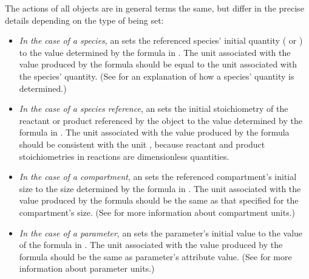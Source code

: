 The actions of all \InitialAssignment objects are in general terms
the same, but differ in the precise details depending on the type
of  being set:
\begin{itemize}

\item \emph{In the case of a species}, an \InitialAssignment sets
  the referenced species' initial quantity
  ( or ) to the value
  determined by the formula in .  The unit associated
  with the value produced by the  formula should be
  equal to the unit associated with the species' quantity.  (See
   for an explanation of how a
  species' quantity is determined.)

\item \emph{In the case of a species reference}, an
  \InitialAssignment sets the initial stoichiometry of the
  reactant or product referenced by the \SpeciesReference object
  to the value determined by the formula in .  The
  unit associated with the value produced by the 
  formula should be consistent with the unit
  , because reactant and product
  stoichiometries in reactions are dimensionless quantities.

\item \emph{In the case of a compartment}, an \InitialAssignment
  sets the referenced compartment's initial size to the size
  determined by the formula in .  The unit associated
  with the value produced by the  formula should be
  the same as that specified for the compartment's size.  (See
   for more information about
  compartment units.)

\item \emph{In the case of a parameter}, an \InitialAssignment
  sets the parameter's initial value to the value of the formula
  in .  The unit associated with the value produced by
  the  formula should be the same as parameter's
   attribute value.  (See
   for more information about
  parameter units.)


\end{itemize}

